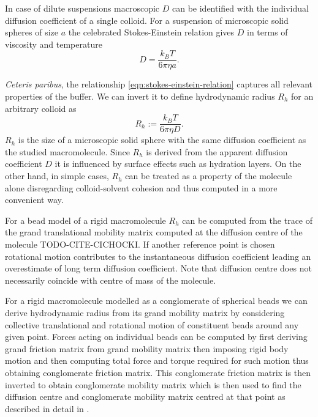 \documentclass{doctoral}
\begin{document}
In case of dilute suspensions macroscopic $D$ can be identified with the individual diffusion coefficient of a single colloid.
For a suspension of microscopic solid spheres of size $a$ the celebrated Stokes-Einstein relation gives $D$ in terms of viscosity and temperature
\begin{equation}
    D = \frac{k_B T}{6 \pi \eta a}.
    \label{eqn:stokes-einstein-relation}
\end{equation}

\textit{Ceteris paribus}, the relationship \eqref{eqn:stokes-einstein-relation} captures all relevant properties of the buffer.
We can invert it to define hydrodynamic radius $R_h$ for an arbitrary colloid as
\begin{equation}
    R_h :=  \frac{k_B T}{6 \pi \eta D}.
    \label{eqn:hydrodynamic-radius-definition}
\end{equation}
$R_h$ is the size of a microscopic solid sphere with the same diffusion coefficient as the studied macromolecule.
Since $R_h$ is derived from the apparent diffusion coefficient $D$ it is influenced by surface effects such as hydration layers.
On the other hand, in simple cases, $R_h$ can be treated as a property of the molecule alone disregarding colloid-solvent cohesion and thus computed in a more convenient way.

For a bead model of a rigid macromolecule $R_h$ can be computed from the trace of the grand translational mobility matrix computed at the diffusion centre of the molecule TODO-CITE-CICHOCKI.
If another reference point is chosen rotational motion contributes to the instantaneous diffusion coefficient leading an overestimate of long term diffusion coefficient.
Note that diffusion centre does not necessarily coincide with centre of mass of the molecule.

For a rigid macromolecule modelled as a conglomerate of spherical beads we can derive hydrodynamic radius from its grand mobility matrix by considering collective translational and rotational motion of constituent beads around any given point.
Forces acting on individual beads can be computed by first deriving grand friction matrix from grand mobility matrix then imposing rigid body motion and then computing total force and torque required for such motion thus obtaining conglomerate friction matrix.
This conglomerate friction matrix is then inverted to obtain conglomerate mobility matrix which is then used to find the diffusion centre and conglomerate mobility matrix centred at that point as described in detail in \cite{Cichocki_2019}.
\end{document}
